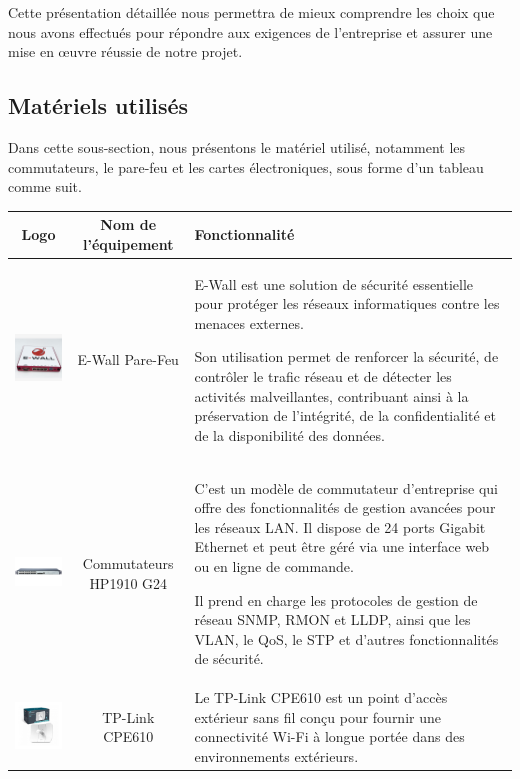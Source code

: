 Cette présentation détaillée nous permettra de mieux comprendre les choix que nous avons effectués pour répondre aux exigences de l'entreprise et assurer une mise en œuvre réussie de notre projet. \\

\subsection{Matériels utilisés}

Dans cette sous-section, nous présentons le matériel utilisé, notamment les commutateurs, le pare-feu et les cartes électroniques, sous forme d'un tableau comme suit.


\begin{table}[H]
\begin{center}
\begin{tabular}{|c{3cm}|c{3cm}|l{10cm}|}
\hline
\textbf{Logo}         & \textbf{Nom de l'équipement}   & \textbf{Fonctionnalité} \\
\hline
\includegraphics[width=3cm]{Images/ewall.jpg} & E-Wall Pare-Feu & E-Wall est une solution de sécurité essentielle pour protéger les réseaux informatiques contre les menaces externes. 

Son utilisation permet de renforcer la sécurité, de contrôler le trafic réseau et de détecter les activités malveillantes, contribuant ainsi à la préservation de l'intégrité, de la confidentialité et de la disponibilité des données. \\
\hline
\includegraphics[width=3cm]{Images/HP1910.jpg} & Commutateurs HP1910 G24 & C'est un modèle de commutateur d'entreprise qui offre des fonctionnalités de gestion avancées pour les réseaux LAN. Il dispose de 24 ports Gigabit Ethernet et peut être géré via une interface web ou en ligne de commande. 

Il prend en charge les protocoles de gestion de réseau SNMP, RMON et LLDP, ainsi que les VLAN, le QoS, le STP et d'autres fonctionnalités de sécurité.  \\
\hline
\includegraphics[width=3cm]{Images/TP-Link-CPE610-5GHz_1.png} & TP-Link CPE610 & Le TP-Link CPE610 est un point d'accès extérieur sans fil conçu pour fournir une connectivité Wi-Fi à longue portée dans des environnements extérieurs. 


\end{tabular}
\end{center}
\end{table}

